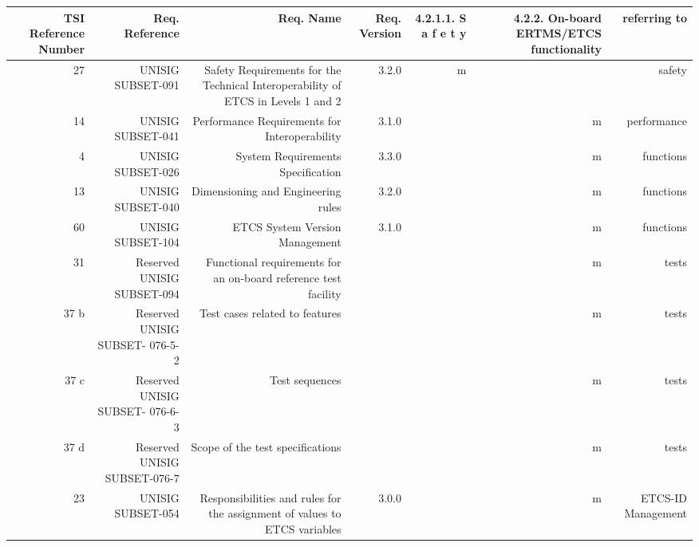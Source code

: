 \begin{tabular}{rrrrrrr}
\toprule
TSI Reference Number & 
Req. Reference & 
Req. Name & 
Req. Version & 
4.2.1.1. S a f e t y &
4.2.2. On-board ERTMS/ETCS functionality &
referring to \\
\midrule
27    & UNISIG SUBSET-091 & Safety Requirements for the Technical Interoperability of ETCS in Levels 1 and 2 & 3.2.0 & m     &       & safety \\
14    & UNISIG SUBSET-041 & Performance Requirements for Interoperability & 3.1.0 &       & m     & performance \\
4     & UNISIG SUBSET-026 & System Requirements Specification & 3.3.0 &       & m     & functions \\
13    & UNISIG SUBSET-040 & Dimensioning and
Engineering rules & 3.2.0 &       & m     & functions \\
60    & UNISIG SUBSET-104 & ETCS System Version Management & 3.1.0 &       & m     & functions \\
31    & Reserved UNISIG SUBSET-094 & Functional requirements for an on-board reference test facility &       &       & m     & tests \\
37 b  & Reserved UNISIG SUBSET-
076-5-2 & Test cases related to features &       &       & m     & tests \\
37 c  & Reserved UNISIG SUBSET-
076-6-3 & Test sequences &       &       & m     & tests \\
37 d  & Reserved UNISIG SUBSET-076-7 & Scope of the test specifications &       &       & m     & tests \\
23    & UNISIG SUBSET-054 & Responsibilities and rules for the assignment of values to ETCS variables & 3.0.0 &       & m     & ETCS-ID Management \\
\bottomrule
\end{tabular}%
